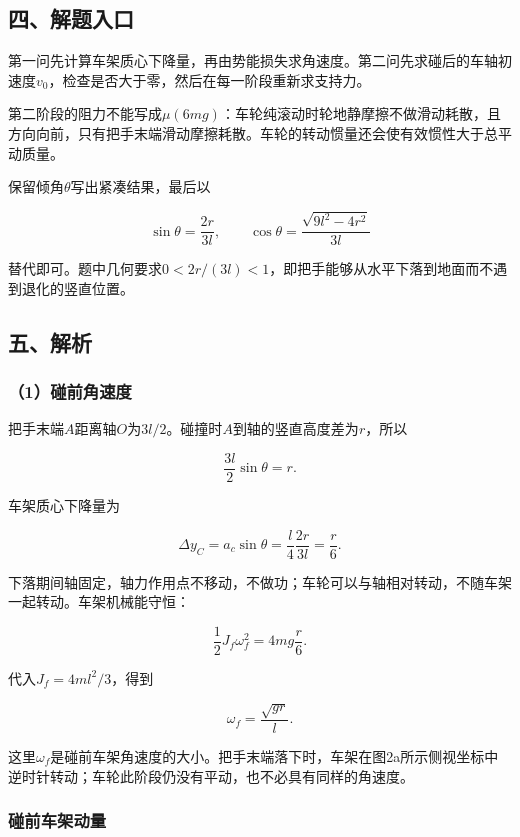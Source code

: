 \documentclass[12pt,a4paper,fontset=fandol]{ctexart}
\begin{document}
\subsection{四、解题入口}\label{ux56dbux89e3ux9898ux5165ux53e3-1}

第一问先计算车架质心下降量，再由势能损失求角速度。第二问先求碰后的车轴初速度\(v_0\)，检查是否大于零，然后在每一阶段重新求支持力。

第二阶段的阻力不能写成\(\mu(6mg)\)：车轮纯滚动时轮地静摩擦不做滑动耗散，且方向向前，只有把手末端滑动摩擦耗散。车轮的转动惯量还会使有效惯性大于总平动质量。

保留倾角\(\theta\)写出紧凑结果，最后以

\[
\sin\theta=\frac{2r}{3l},\qquad
\cos\theta=\frac{\sqrt{9l^2-4r^2}}{3l}
\]

替代即可。题中几何要求\(0<2r/(3l)<1\)，即把手能够从水平下落到地面而不遇到退化的竖直位置。

\subsection{五、解析}\label{ux4e94ux89e3ux6790-1}

\subsubsection{（1）碰前角速度}\label{ux78b0ux524dux89d2ux901fux5ea6}

把手末端\(A\)距离轴\(O\)为\(3l/2\)。碰撞时\(A\)到轴的竖直高度差为\(r\)，所以

\[
\frac{3l}{2}\sin\theta=r.
\]

车架质心下降量为

\[
\Delta y_C=a_c\sin\theta
=\frac l4\frac{2r}{3l}=\frac r6.
\]

下落期间轴固定，轴力作用点不移动，不做功；车轮可以与轴相对转动，不随车架一起转动。车架机械能守恒：

\[
\frac12J_f\omega_f^2=4mg\frac r6.
\]

代入\(J_f=4ml^2/3\)，得到

\[
\boxed{\omega_f=\frac{\sqrt{gr}}l}.
\]

这里\(\omega_f\)是碰前车架角速度的大小。把手末端落下时，车架在图2a所示侧视坐标中逆时针转动；车轮此阶段仍没有平动，也不必具有同样的角速度。

\subsubsection{碰前车架动量}\label{ux78b0ux524dux8f66ux67b6ux52a8ux91cf}
\end{document}
